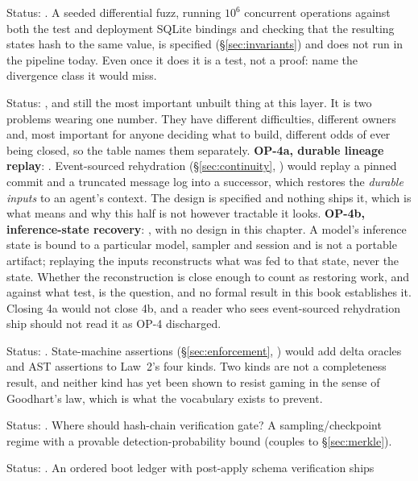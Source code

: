 \documentclass[11pt,a4paper]{article}
\theoremstyle{definition}
\theoremstyle{remark}
\begin{document}
\begin{description}[leftmargin=2.2em,style=nextline]
\item[$\bigstar$ OP-3: Cross-runtime soundness.] Status: \Open. A seeded differential
fuzz, running $10^6$ concurrent operations against both the test and deployment SQLite
bindings and checking that the resulting states hash to the same value, is specified
(\S\ref{sec:invariants}) and does not run in the pipeline today. Even once it does
it is a test, not a proof: name the divergence class it would miss.
\item[$\bigstar$ OP-4: Checkpoint that restores work.] Status: \Open, and still the most
important unbuilt thing at this layer. It is two problems wearing one number. They
have different difficulties, different owners and, most important for anyone
deciding what to build, different odds of ever being closed, so the table names
them separately.
\textbf{OP-4a, durable lineage replay}: \Open. Event-sourced rehydration
(\S\ref{sec:continuity}, \Designed) would replay a pinned commit and a truncated
message log into a successor, which restores the \emph{durable inputs} to an agent's
context. The design is specified and nothing ships it, which is what \Designed{}
means and why this half is not \Closed{} however tractable it looks.
\textbf{OP-4b, inference-state recovery}: \Open, with no design in this chapter.
A model's inference state is bound to a particular model, sampler and session and is
not a portable artifact; replaying the inputs reconstructs what was fed to that
state, never the state. Whether the reconstruction is close enough to count as
restoring work, and against what test, is the question, and no formal result in
this book establishes it. Closing 4a would not close 4b, and a reader who sees
event-sourced rehydration ship should not read it as OP-4 discharged.
\item[$\bigstar$ OP-5: Oracle completeness.] Status: \Open. State-machine assertions
(\S\ref{sec:enforcement}, \Designed) would add delta oracles and AST assertions to
Law~2's four kinds. Two kinds are not a completeness
result, and neither kind has yet been shown to resist gaming in the sense of
Goodhart's law, which is what the vocabulary exists to prevent.
\item[$\bigstar$ OP-6: Tamper-evidence on the read path.] Status: \Open. Where should
hash-chain verification gate? A sampling/checkpoint regime with a provable
detection-probability bound (couples to \S\ref{sec:merkle}).
\item[$\bigstar$ OP-7: Schema evolution without a sequencer.] Status: \Partial. An
ordered boot ledger with post-apply schema verification ships

\end{description}
\end{document}
